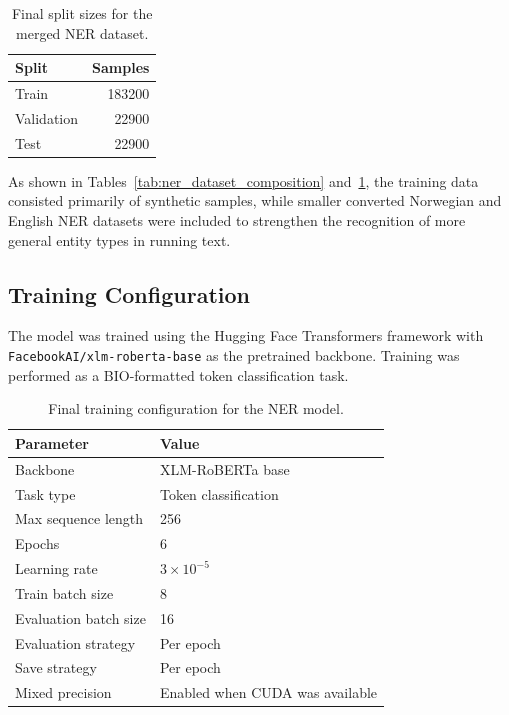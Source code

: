 \begin{table}[H]
\centering
\begin{tabular}{l r}
\toprule
\textbf{Split} & \textbf{Samples} \\
\midrule
Train & 183200 \\
Validation & 22900 \\
Test & 22900 \\
\bottomrule
\end{tabular}
\caption{Final split sizes for the merged NER dataset.}
\label{tab:ner_final_splits}
\end{table}

As shown in Tables~\ref{tab:ner_dataset_composition} and~\ref{tab:ner_final_splits},
the training data consisted primarily of synthetic samples, while smaller converted
Norwegian and English NER datasets were included to strengthen the recognition of
more general entity types in running text.

\subsection{Training Configuration}

The model was trained using the Hugging Face Transformers framework with
\texttt{FacebookAI/xlm-roberta-base} as the pretrained backbone. Training was
performed as a BIO-formatted token classification task.

\begin{table}[H]
\centering
\begin{tabular}{l l}
\toprule
\textbf{Parameter} & \textbf{Value} \\
\midrule
Backbone & XLM-RoBERTa base \\
Task type & Token classification \\
Max sequence length & 256 \\
Epochs & 6 \\
Learning rate & \(3 \times 10^{-5}\) \\
Train batch size & 8 \\
Evaluation batch size & 16 \\
Evaluation strategy & Per epoch \\
Save strategy & Per epoch \\
Mixed precision & Enabled when CUDA was available \\
\bottomrule
\end{tabular}
\caption{Final training configuration for the NER model.}
\label{tab:ner_training_config}
\end{table}

